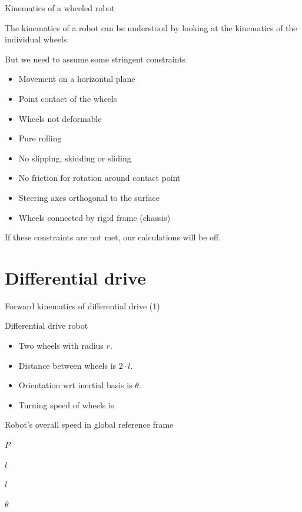 \documentclass[compress]{beamer}
\begin{document}
\begin{frame}{Kinematics of a wheeled robot}

The kinematics of a robot can be understood by looking at the kinematics
of the individual wheels.

But we need to assume some stringent constraints

\begin{itemize}
    \item Movement on a horizontal plane
    \item Point contact of the wheels
    \item Wheels not deformable
    \item Pure rolling
    \item No slipping, skidding or sliding
    \item No friction for rotation around contact point
    \item Steering axes orthogonal to the surface
    \item Wheels connected by rigid frame (chassis)
\end{itemize}

If these constraints are not met, our calculations will be off.

\end{frame}

\section{Differential drive}

\begin{frame}{Forward kinematics of differential drive (1)}

Differential drive robot

\begin{itemize}
    \item Two wheels with radius $r$.
    \item Distance between wheels is $2\cdot l$.
    \item Orientation wrt inertial basis is $\theta$.
    \item Turning speed of wheels is
\end{itemize}

Robot's overall speed in global reference frame

$P$

$l$

$l$

$\theta$

\end{frame}
\end{document}
